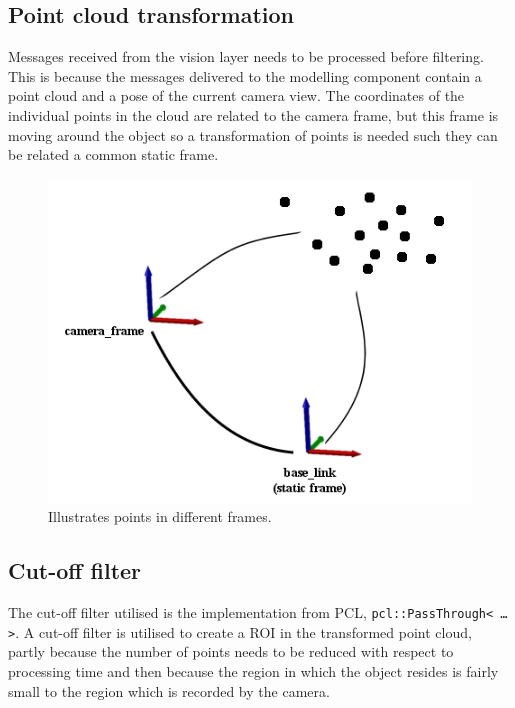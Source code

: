 \subsection{Point cloud transformation}
Messages received from the vision layer needs to be processed before filtering. This is because the messages delivered to the modelling component contain a point cloud and a pose of the current camera view. The coordinates of the individual points in the cloud are related to the camera frame, but this frame is moving around the object so a transformation of points is needed such they can be related a common static frame.
\begin{figure}[htb]
	\begin{center}
		\includegraphics[scale=0.7,trim=0 0 0 0]{graphics/07_modelling/pctransform.png}%
		\caption{Illustrates points in different frames.}
		\label{fig:filtering_transform}
	\end{center}
\end{figure}

\subsection{Cut-off filter}
The cut-off filter utilised is the implementation from PCL, \texttt{pcl::PassThrough< \ldots >}. A cut-off filter is utilised to create a ROI in the transformed point cloud, partly because the number of points needs to be reduced with respect to processing time and then because the region in which the object resides is fairly small to the region which is recorded by the camera.

